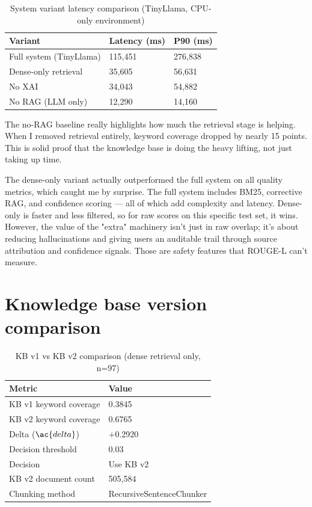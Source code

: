 \begin{table}[htbp]
\centering
\caption{System variant latency comparison (TinyLlama, CPU-only environment)}
\label{tab:baseline_latency}
\renewcommand{\arraystretch}{1.3}
\begin{tabular}{|l|l|l|}
\hline
\textbf{Variant} & \textbf{Latency (ms)} & \textbf{P90 (ms)} \\
\hline
Full system (TinyLlama) & 115,451 & 276,838 \\
Dense-only retrieval    & 35,605  & 56,631  \\
No XAI                  & 34,043  & 54,882  \\
No RAG (LLM only)       & 12,290  & 14,160  \\
\hline
\end{tabular}
\end{table}

The no-RAG baseline really highlights how much the retrieval stage is helping. When I removed retrieval entirely, keyword coverage dropped by nearly 15 points. This is solid proof that the knowledge base is doing the heavy lifting, not just taking up time.

The dense-only variant actually outperformed the full system on all quality metrics, which caught me by surprise. The full system includes BM25, corrective RAG, and confidence scoring --- all of which add complexity and latency. Dense-only is faster and less filtered, so for raw scores on this specific test set, it wins. However, the value of the "extra" machinery isn't just in raw overlap; it's about reducing hallucinations and giving users an auditable trail through source attribution and confidence signals. Those are safety features that ROUGE-L can't measure.

\section{Knowledge base version comparison}

\begin{table}[htbp]
\centering
\caption{KB v1 vs KB v2 comparison (dense retrieval only, n=97)}
\renewcommand{\arraystretch}{1.3}
\begin{tabular}{|l|l|}
\hline
\textbf{Metric} & \textbf{Value} \\
\hline
KB v1 keyword coverage & 0.3845 \\
KB v2 keyword coverage & 0.6765 \\
Delta ($\ac{delta}$) & +0.2920 \\
Decision threshold & 0.03 \\
Decision & Use KB v2 \\
KB v2 document count & 505,584 \\
Chunking method & RecursiveSentenceChunker \\
\hline
\end{tabular}
\end{table}

